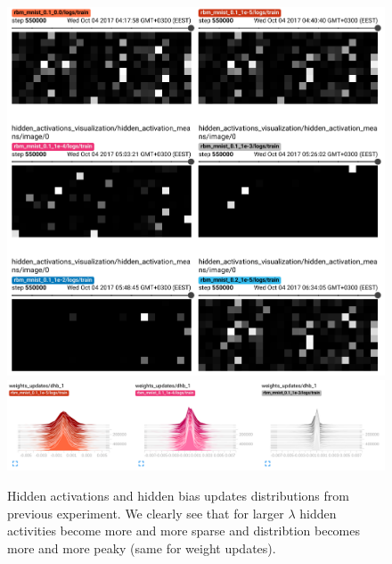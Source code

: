 \begin{figure}[h]
\begin{mdframed}
\centering
\includegraphics[width=4.8in]{rbm-mnist/st_hidden_activations.png}
\\[4em]
\includegraphics[width=5.6in]{rbm-mnist/st_hb_updates.png}
\caption{Hidden activations and hidden bias updates distributions from previous experiment. We clearly see that for larger $\lambda$ hidden activities become more and more sparse and distribtion becomes more and more peaky (same for weight updates).}
\end{mdframed}
\end{figure}

\clearpage

